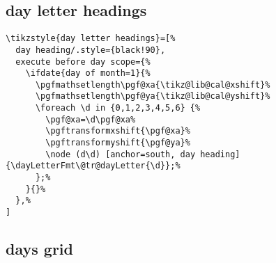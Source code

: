 \documentclass[11pt,oneside]{memoir-article}
\begin{document}
\subsection{day letter headings}
\label{sec-10-6-1}

\begin{verbatim}
\tikzstyle{day letter headings}=[%
  day heading/.style={black!90},
  execute before day scope={%
    \ifdate{day of month=1}{%
      \pgfmathsetlength\pgf@xa{\tikz@lib@cal@xshift}%
      \pgfmathsetlength\pgf@ya{\tikz@lib@cal@yshift}%
      \foreach \d in {0,1,2,3,4,5,6} {%
        \pgf@xa=\d\pgf@xa%
        \pgftransformxshift{\pgf@xa}%
        \pgftransformyshift{\pgf@ya}%
        \node (d\d) [anchor=south, day heading] {\dayLetterFmt\@tr@dayLetter{\d}};%
      };%
    }{}%
  },%
]
\end{verbatim}

\subsection{days grid}
\label{sec-10-6-2}
\end{document}
